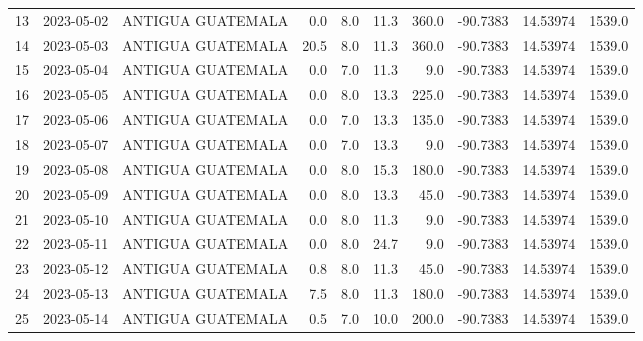 \documentclass[12pt]{article}
\begin{document}
\begin{center}
\begin{tabular}{lllrrrrrrr}
13  & 2023-05-02 &  ANTIGUA GUATEMALA &     0.0 &  8.0 &        11.3 &       360.0 &  -90.7383 &  14.53974 &   1539.0 \\
14  & 2023-05-03 &  ANTIGUA GUATEMALA &    20.5 &  8.0 &        11.3 &       360.0 &  -90.7383 &  14.53974 &   1539.0 \\
15  & 2023-05-04 &  ANTIGUA GUATEMALA &     0.0 &  7.0 &        11.3 &         9.0 &  -90.7383 &  14.53974 &   1539.0 \\
16  & 2023-05-05 &  ANTIGUA GUATEMALA &     0.0 &  8.0 &        13.3 &       225.0 &  -90.7383 &  14.53974 &   1539.0 \\
17  & 2023-05-06 &  ANTIGUA GUATEMALA &     0.0 &  7.0 &        13.3 &       135.0 &  -90.7383 &  14.53974 &   1539.0 \\
18  & 2023-05-07 &  ANTIGUA GUATEMALA &     0.0 &  7.0 &        13.3 &         9.0 &  -90.7383 &  14.53974 &   1539.0 \\
19  & 2023-05-08 &  ANTIGUA GUATEMALA &     0.0 &  8.0 &        15.3 &       180.0 &  -90.7383 &  14.53974 &   1539.0 \\
20  & 2023-05-09 &  ANTIGUA GUATEMALA &     0.0 &  8.0 &        13.3 &        45.0 &  -90.7383 &  14.53974 &   1539.0 \\
21  & 2023-05-10 &  ANTIGUA GUATEMALA &     0.0 &  8.0 &        11.3 &         9.0 &  -90.7383 &  14.53974 &   1539.0 \\
22  & 2023-05-11 &  ANTIGUA GUATEMALA &     0.0 &  8.0 &        24.7 &         9.0 &  -90.7383 &  14.53974 &   1539.0 \\
23  & 2023-05-12 &  ANTIGUA GUATEMALA &     0.8 &  8.0 &        11.3 &        45.0 &  -90.7383 &  14.53974 &   1539.0 \\
24  & 2023-05-13 &  ANTIGUA GUATEMALA &     7.5 &  8.0 &        11.3 &       180.0 &  -90.7383 &  14.53974 &   1539.0 \\
25  & 2023-05-14 &  ANTIGUA GUATEMALA &     0.5 &  7.0 &        10.0 &       200.0 &  -90.7383 &  14.53974 &   1539.0 \\
\bottomrule
\end{tabular}

        
        \end{center}
        
\end{document}
